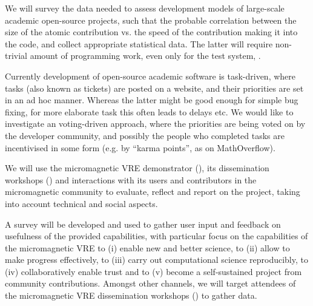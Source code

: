 \begin{workpackage}[id=social-aspects,wphases=0-48,
  title=Social Aspects,
  lead=UO,
  UORM=51,USHRM=8, USORM=6]
\begin{tasklist}
\begin{task}[title=Survey and collection of needed data,id=datacollection]
We will survey the data needed to assess development models of
large-scale academic open-source projects, such that the probable
correlation between the size of the atomic contribution vs. the speed
of the contribution making it into the code, and collect appropriate
statistical data. The latter will require non-trivial amount of
programming work, even only for the test system, \Sage.
\end{task}

\begin{task}[title=Collective decision making in development,id=decisionmaking]
Currently development of open-source academic software is task-driven,
where tasks (also known as tickets) are posted on a website, and their
priorities are set in an ad hoc manner.  Whereas the latter might be
good enough for simple bug fixing, for more elaborate task this often
leads to delays etc.  We would like to investigate an voting-driven
approach, where the priorities are being voted on by the developer
community, and possibly the people who completed tasks are
incentivised in some form (e.g. by ``karma points'', as on
MathOverflow).
\end{task}

\begin{task}[title=Evaluation of Micromagnetic VRE,lead=USO,PM=6,id=oommf-nb-evaluation]
  We will use the micromagnetic VRE demonstrator
  (), its dissemination
  workshops \linebreak()
  and interactions with its users and contributors in the
  micromagnetic community to evaluate, reflect and report on the project,
  taking into account technical and social aspects.

  A survey will be developed and used to gather user input and
  feedback on usefulness of the provided capabilities, with particular
  focus on the capabilities of the micromagnetic VRE to (i) enable new
  and better science, to (ii) allow to make progress effectively, to
  (iii) carry out computational science reproducibly, to (iv)
  collaboratively enable trust and to (v) become a self-sustained
  project from community contributions. Amongst other channels, we
  will target attendees of the micromagnetic VRE dissemination
  workshops () to
  gather data.


\end{task}
\end{tasklist}
\end{workpackage}
